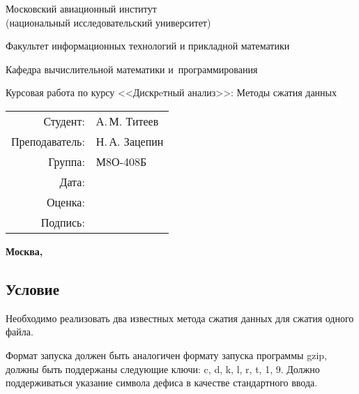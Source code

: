 \documentclass[12pt]{article}
\begin{document}
\begin{titlepage}
	\begin{center}
		\bfseries
		
		{\Large Московский авиационный институт\\ (национальный исследовательский университет)
			
		}
		
		\vspace{48pt}
		
		{\large Факультет информационных технологий и прикладной математики
		}
		
		\vspace{36pt}
		
		
		{\large Кафедра вычислительной математики и~программирования
			
		}
		
		
		\vspace{48pt}
		
		Курсовая работа по курсу <<Дискрeтный анализ>>: Методы сжатия данных
	\end{center}
	
	\vspace{72pt}
	
	\begin{flushright}
		\begin{tabular}{rl}
			Студент: & А.\,М. Титеев  \\
			Преподаватель: & Н.\,А. Зацепин \\
			Группа: & М8О-408Б \\
			Дата: & \\
			Оценка: & \\
			Подпись: & \\
		\end{tabular}
	\end{flushright}
	
	\vfill
	
	\begin{center}
		\bfseries
		Москва, \the\year
	\end{center}
\end{titlepage}

\pagebreak
\subsection*{Условие}

Необходимо реализовать два известных метода сжатия данных для сжатия одного файла. 

Формат запуска должен быть аналогичен формату запуска программы gzip, должны быть поддержаны следующие ключи: c, d, k, l, r, t, 1, 9. Должно поддерживаться указание символа дефиса в качестве стандартного ввода.
\end{document}
